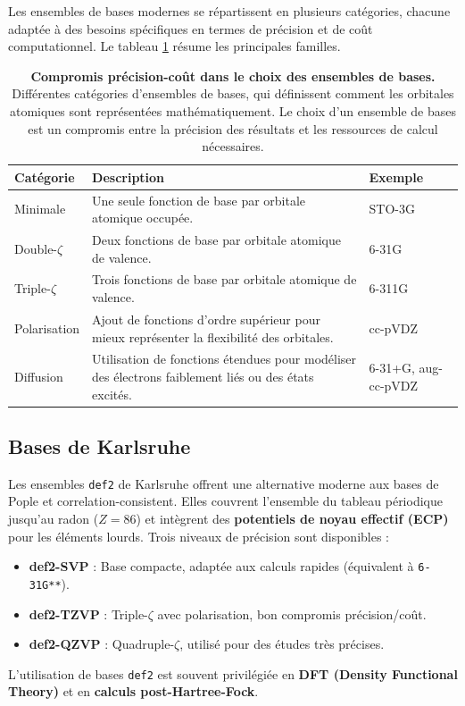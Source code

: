 \documentclass[12pt,a4paper]{article} %
\numberwithin{equation}{section} %
\numberwithin{figure}{section} %
\numberwithin{table}{section} %
\begin{document}
Les ensembles de bases modernes se répartissent en plusieurs catégories,
chacune adaptée à des besoins spécifiques en termes de précision et de coût
computationnel. Le tableau \ref{tab:basis_sets} résume les principales familles.

\begin{table}[h!]
    \centering
    \begin{tabular}{|l|p{8cm}|p{3cm}|}
        \hline
        \textbf{Catégorie} & \textbf{Description} & \textbf{Exemple} \\
        \hline
        Minimale & Une seule fonction de base par orbitale atomique occupée. & STO-3G \\
        \hline
        Double-$\zeta$ & Deux fonctions de base par orbitale atomique de valence. & 6-31G \\
        \hline
        Triple-$\zeta$ & Trois fonctions de base par orbitale atomique de valence. & 6-311G \\
        \hline
        Polarisation & Ajout de fonctions d'ordre supérieur pour mieux représenter la flexibilité des orbitales. & cc-pVDZ \\
        \hline
        Diffusion & Utilisation de fonctions étendues pour modéliser des électrons faiblement liés ou des états excités. & 6-31+G, aug-cc-pVDZ \\
        \hline
    \end{tabular}
    \caption{\textbf{Compromis précision-coût dans le choix des ensembles de bases.} Différentes catégories d'ensembles de bases, qui définissent comment les orbitales atomiques sont représentées mathématiquement. Le choix d'un ensemble de bases est un compromis entre la précision des résultats et les ressources de calcul nécessaires.}
    \label{tab:basis_sets}
\end{table}

\subsection{Bases de Karlsruhe}

Les ensembles \texttt{def2} de Karlsruhe offrent une alternative moderne aux bases de Pople et correlation-consistent. Elles couvrent l’ensemble du tableau périodique jusqu’au radon ($Z=86$) et intègrent des
\textbf{potentiels de noyau effectif (ECP)} pour les éléments lourds. Trois niveaux de précision sont disponibles :
\begin{itemize}
    \item \textbf{def2-SVP} : Base compacte, adaptée aux calculs rapides (équivalent à \texttt{6-31G**}).
    \item \textbf{def2-TZVP} : Triple-$\zeta$ avec polarisation, bon compromis précision/coût.
    \item \textbf{def2-QZVP} : Quadruple-$\zeta$, utilisé pour des études très précises.
\end{itemize}
L'utilisation de bases \texttt{def2} est souvent privilégiée en \textbf{DFT (Density Functional Theory)} et en \textbf{calculs post-Hartree-Fock}.
\end{document}
